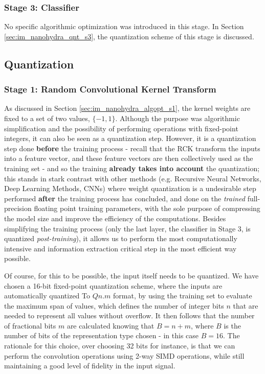         \subsubsection{Stage 3: Classifier}\label{sec:im_nanohydra_algopt_s3}
        No specific algorithmic optimization was introduced in this stage. In Section \ref{sec:im_nanohydra_qnt_s3}, the quantization scheme of this stage is discussed.

    \subsection{Quantization}\label{sec:im_nanohydra_qnt}

        \subsubsection{Stage 1: Random Convolutional Kernel Transform}\label{sec:im_nanohydra_qnt_s1}

        As discussed in Section \ref{sec:im_nanohydra_algopt_s1}, the kernel weights are fixed to a set of two values, $\{-1,1\}$. Although the purpose was 
        algorithmic simplification and the possibility of performing operations with fixed-point integers, it can also be seen as a quantization step. 
        However, it is a quantization step done \textbf{before} the training process - recall that the RCK transform the inputs 
        into a feature vector, and these feature vectors are then collectively used as the training set - and so the training \textbf{already takes into account} the quantization; this
        stands in stark contrast with other methods (e.g. Recursive Neural Networks, Deep Learning Methods, CNNs) where weight quantization is a undesirable step performed \textbf{after} the training process has concluded, and 
        done on the \emph{trained} full-precision floating point training parameters, with the sole purpose of compressing the model size and improve the efficiency of the computations.
        Besides simplifying the training process (only the last layer, the classifier in Stage 3, is quantized \emph{post-training}), it allows us to perform the most computationally intensive and
        information extraction critical step in the most efficient way possible.

        Of course, for this to be possible, the input itself needs to be quantized. We have chosen a 16-bit fixed-point quantization scheme, where the inputs are automatically quantized To
        $Qn.m$ format, by using the training set to evaluate the maximum span of values, which defines the number of integer bits $n$
        that are needed to represent all values without overflow. It then follows that the number of fractional bits $m$ are calculated knowing that $B=n+m$, where $B$ is the number of bits 
        of the representation type chosen - in this case $B=16$. The rationale for this choice, over choosing 32 bits for instance, is that we can perform the convolution operations using 
        2-way SIMD operations, while still maintaining a good level of fidelity in the input signal.

